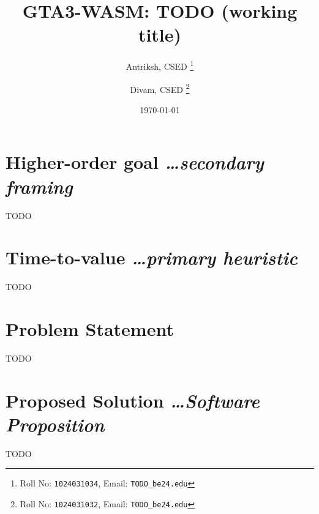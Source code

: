 \documentclass[11pt,a4paper]{article}
\title{GTA3-WASM: TODO (working title)}
\author{
  Antriksh, CSED%
  \thanks{Roll No: \texttt{1024031034}, %
    Email: \texttt{TODO\_be24\@thapar.edu}}
  \and
  Divam, CSED%
  \thanks{Roll No: \texttt{1024031032}, %
    Email: \texttt{TODO\_be24\@thapar.edu}}
}
\date{\today}
\newcommand{\BvrHint}[1]{%
  {\normalfont\normalsize\itshape\hfill #1}}
\begin{document}
\maketitle

\section{Higher-order goal%
  \BvrHint{\ldots secondary framing}}
TODO

\section{Time-to-value %
\BvrHint{\ldots primary heuristic}}
TODO

\section{Problem Statement}
TODO

\section{Proposed Solution %
\BvrHint{\ldots Software Proposition}}
TODO
\end{document}
